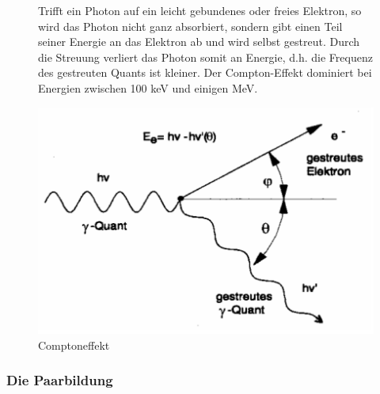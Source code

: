\begin{figure}[H]
	\begin{minipage}{0.4\textwidth}
	Trifft ein Photon auf ein leicht gebundenes oder freies Elektron, so wird das Photon nicht ganz absorbiert, sondern gibt einen Teil seiner Energie an das Elektron ab und wird selbst gestreut. Durch die Streuung verliert das Photon somit an Energie, d.h. die Frequenz des gestreuten Quants ist kleiner. Der Compton-Effekt dominiert bei Energien zwischen 100 keV und einigen MeV.
	\end{minipage}
	\begin{minipage}{0.6\textwidth}
	\centering \includegraphics[width=\textwidth]{Bilder/Comptoneffekt.png}
	\caption{Comptoneffekt}
	\end{minipage}

\end{figure}

\subsubsection{Die Paarbildung}

